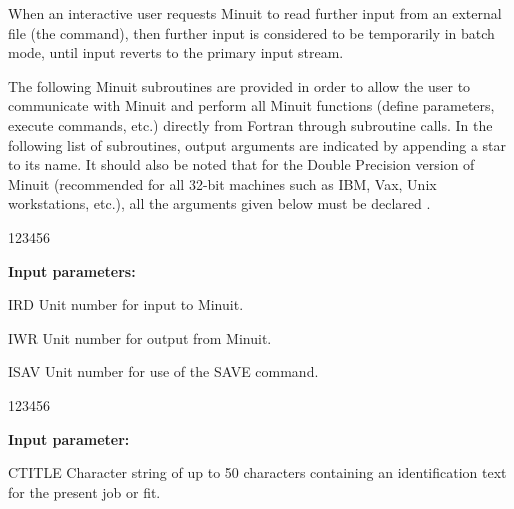 When an interactive user requests Minuit to read
further input from an external file (the  command),
then further input is considered to be temporarily
in batch mode, until input reverts to the primary input stream.


The following Minuit subroutines are provided in order to allow
the user to communicate with Minuit and perform all Minuit
functions (define parameters, execute commands, etc.) directly
from Fortran through subroutine calls.
In the following list of subroutines, output arguments are indicated
by appending a star \Lit{*} to its name.
It should also be noted that for the Double Precision version of
Minuit (recommended for all 32-bit machines such as IBM, Vax,
Unix workstations, etc.), all the  arguments given below must be
declared .

 
 
\begin{DLtt}{123456}
\item[{\rm\bf Input parameters:}]
\item[IRD]  Unit number for input to Minuit.
\item[IWR]  Unit number for output from Minuit.
\item[ISAV] Unit number for use of the SAVE command.
\end{DLtt}
 
 
 
\begin{DLtt}{123456}
\item[{\rm\bf Input parameter:}]
\item[CTITLE] Character string of up to 50 characters containing
              an identification text for the present job or fit.
\end{DLtt}
 
 
 
